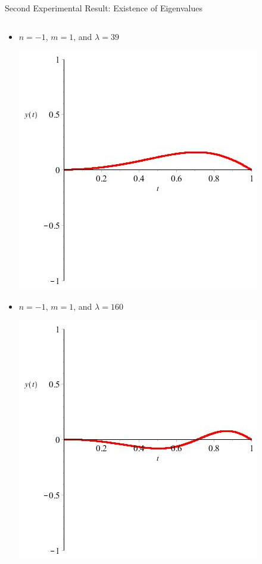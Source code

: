 \documentclass{beamer}
\begin{document}
\begin{frame}{Second Experimental Result: Existence of Eigenvalues}

\begin{columns}[T]

\hspace*{-3mm}

\begin{column}{35mm}

\begin{itemize}

\item $n=-1$, $m=1$, and $\lambda=39$

\includegraphics[scale=0.2]{NEqualsNegative1MEquals1LambdaEquals39}

\end{itemize}

\begin{itemize}

\vspace*{-3mm}

\item $n=-1$, $m=1$, and $\lambda=160$

\includegraphics[scale=0.2]{NEqualsNegative1MEquals1LambdaEquals160}


\end{itemize}
\end{column}
\end{columns}
\end{frame}
\end{document}
